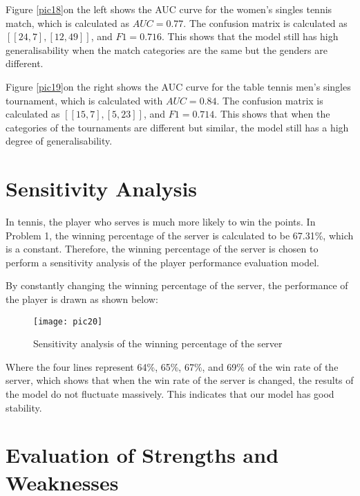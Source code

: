 \documentclass[12pt]{article}  %
\begin{document}
Figure \ref{pic18}on the left shows the AUC curve for the women's singles tennis match, which is calculated as $AUC = 0.77$. The confusion matrix is calculated as $[[ 24, 7], [ 12, 49]]$, and $F1 = 0.716$. This shows that the model still has high generalisability when the match categories are the same but the genders are different.

Figure \ref{pic19}on the right shows the AUC curve for the table tennis men's singles tournament, which is calculated with $AUC = 0.84$. The confusion matrix is calculated as $[[15, 7], [ 5, 23]]$, and $F1 = 0.714$. This shows that when the categories of the tournaments are different but similar, the model still has a high degree of generalisability.

\section{Sensitivity Analysis}
In tennis, the player who serves is much more likely to win the points. In Problem 1, the winning percentage of the server is calculated to be 67.31\%, which is a constant. Therefore, the winning percentage of the server is chosen to perform a sensitivity analysis of the player performance evaluation model.

By constantly changing the winning percentage of the server, the performance of the player is drawn as shown below:

\begin{figure}[htbp]  %
	\centering  %
	\texttt{[image: pic20]} %
	\caption{Sensitivity analysis of the winning percentage of the server}  
	\label{pic20}
\end{figure}

Where the four lines represent 64\%, 65\%, 67\%, and 69\% of the win rate of the server, which shows that when the win rate of the server is changed, the results of the model do not fluctuate massively. This indicates that our model has good stability.

\section{Evaluation of Strengths and Weaknesses}
\end{document}

